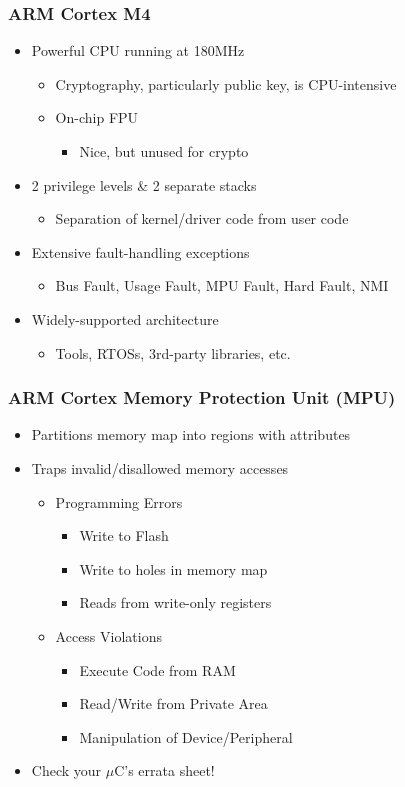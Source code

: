 \subsubsection{ARM Cortex M4}
\begin{itemize}
  \item Powerful CPU running at 180MHz
  \begin{itemize}
    \item Cryptography, particularly public key, is CPU-intensive
    \item On-chip FPU
    \begin{itemize}
      \item Nice, but unused for crypto
    \end{itemize}
  \end{itemize}
  \item 2 privilege levels \& 2 separate stacks
  \begin{itemize}
    \item Separation of kernel/driver code from user code
  \end{itemize}
  \item Extensive fault-handling exceptions
  \begin{itemize}
    \item Bus Fault, Usage Fault, MPU Fault, Hard Fault, NMI
  \end{itemize}
  \item Widely-supported architecture
  \begin{itemize}
    \item Tools, RTOSs, 3rd-party libraries, etc.
  \end{itemize}
\end{itemize}

\subsubsection{ARM Cortex Memory Protection Unit (MPU)}
\begin{itemize}
  \item Partitions memory map into regions with attributes
  \item Traps invalid/disallowed memory accesses
  \begin{itemize}
    \item Programming Errors
    \begin{itemize}
      \item Write to Flash
      \item Write to holes in memory map
      \item Reads from write-only registers
    \end{itemize}
    \item Access Violations
    \begin{itemize}
      \item Execute Code from RAM
      \item Read/Write from Private Area
      \item Manipulation of Device/Peripheral
    \end{itemize}
  \end{itemize}
  \item Check your $\mu$C's errata sheet!
\end{itemize}

